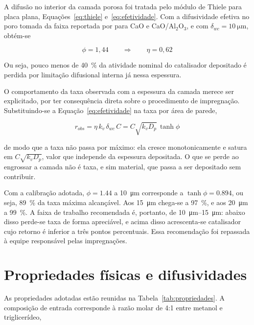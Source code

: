 A difusão no interior da camada porosa foi tratada pelo módulo de Thiele para
placa plana, Equações~\eqref{eq:thiele} e~\eqref{eq:efetividade}. Com a
difusividade efetiva no poro tomada da faixa reportada por
\textcite{Fonseca2026} para CaO e CaO/Al$_2$O$_3$, e com
$\delta_{wc} = \SI{10}{\micro\meter}$, obtém-se

\begin{equation}
\phi = 1{,}44
\qquad \Longrightarrow \qquad
\eta = 0{,}62
\end{equation}

Ou seja, pouco menos de \SI{40}{\percent} da atividade nominal do catalisador
depositado é perdida por limitação difusional interna já nessa espessura.

O comportamento da taxa observada com a espessura da camada merece ser
explicitado, por ter consequência direta sobre o procedimento de impregnação.
Substituindo-se a Equação~\eqref{eq:efetividade} na taxa por área de parede,

\begin{equation}
r_{obs} = \eta\, k_v\, \delta_{wc}\, C
        = C \sqrt{k_v D_p}\, \tanh \phi
\label{eq:saturacao}
\end{equation}

\noindent
de modo que a taxa não passa por máximo: ela cresce monotonicamente e satura em
$C\sqrt{k_v D_p}$, valor que independe da espessura depositada. O que se perde
ao engrossar a camada não é taxa, e sim material, que passa a ser depositado sem
contribuir.

Com a calibração adotada, $\phi = \num{1.44}$ a \SI{10}{\micro\meter}
corresponde a $\tanh\phi = \num{0.894}$, ou seja, \SI{89}{\percent} da taxa
máxima alcançável. Aos \SI{15}{\micro\meter} chega-se a \SI{97}{\percent}, e
aos \SI{20}{\micro\meter} a \SI{99}{\percent}. A faixa de trabalho
recomendada é, portanto, de \SIrange{10}{15}{\micro\meter}: abaixo disso
perde-se taxa de forma apreciável, e acima disso acrescenta-se catalisador cujo
retorno é inferior a três pontos percentuais. Essa recomendação foi repassada à
equipe responsável pelas impregnações.

\section{Propriedades físicas e difusividades}
\label{sec:difusividades}

As propriedades adotadas estão reunidas na Tabela~\ref{tab:propriedades}. A
composição de entrada corresponde à razão molar de \num{4}:\num{1} entre metanol
e triglicerídeo,

